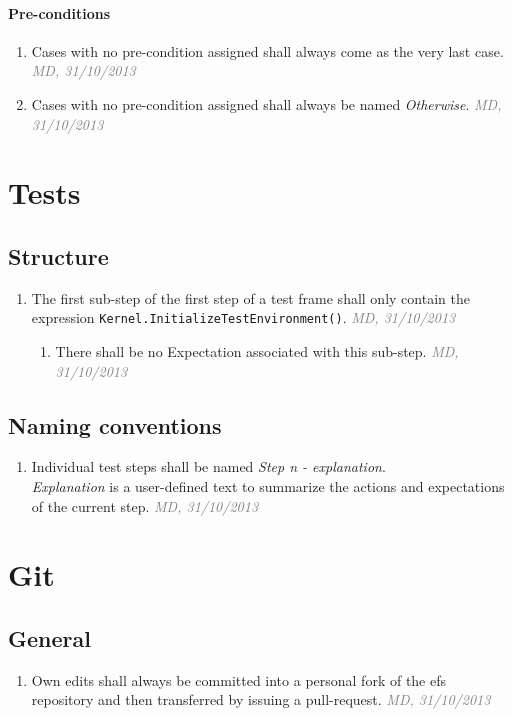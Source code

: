 \documentclass[draft, a4paper, oneside]{scrreprt}
\let\emph\textsl
\newcommand{\literally}[1]{\textsf{\emph{#1}}}
\newcommand{\code}[1]{\lstinline$#1$}
\newcommand{\ruleauthor}[2]{\mbox{}\newline\mbox{}\hfill{\footnotesize\textcolor{gray}{\emph{#1, #2}}}\xspace}}
\newcommand{\ruleauthor}[2]{}
\begin{document}
\subsubsection{Pre-conditions}
\begin{enumerate}
\item Cases with no pre-condition assigned shall always come as the very last case. \ruleauthor{MD}{31/10/2013}
\item Cases with no pre-condition assigned shall always be named \literally{Otherwise}. \ruleauthor{MD}{31/10/2013}
\end{enumerate}

\chapter{Tests}

\section{Structure}
\begin{enumerate}
\item The first sub-step of the first step of a test frame shall only contain the expression \code{Kernel.InitializeTestEnvironment()}. \ruleauthor{MD}{31/10/2013}
\begin{enumerate}
\item There shall be no Expectation associated with this sub-step. \ruleauthor{MD}{31/10/2013}
\end{enumerate}
\end{enumerate}


\section{Naming conventions}
\begin{enumerate}
\item Individual test steps shall be named \literally{Step n - explanation}.\\ \literally{Explanation} is a user-defined text to summarize the actions and expectations of the current step. \ruleauthor{MD}{31/10/2013}
\end{enumerate}



\chapter{Git}
\section{General}
\begin{enumerate}
\item Own edits shall always be committed into a personal fork of the \gls{efs} repository and then transferred by issuing a pull-request. \ruleauthor{MD}{31/10/2013}
\end{enumerate}
\end{document}
